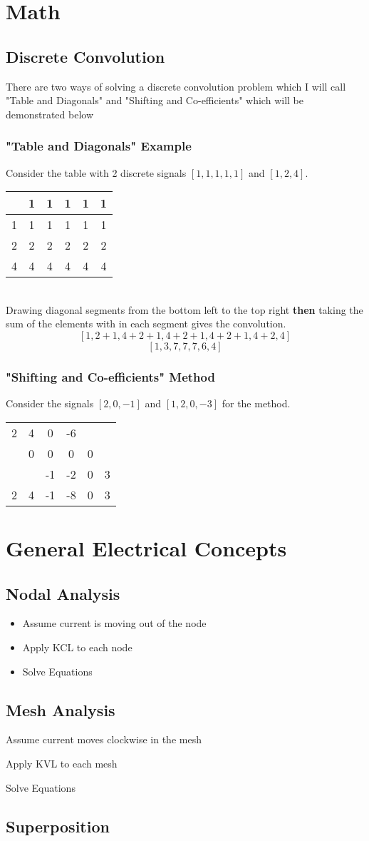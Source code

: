 \documentclass{article}
\begin{document}
\section*{Math}
\subsection*{Discrete Convolution}
There are two ways of solving a discrete convolution problem which I will call "Table and Diagonals" and "Shifting and Co-efficients" which will be demonstrated below
\subsubsection*{"Table and Diagonals" Example}
Consider the table with 2 discrete signals $ [1,1,1,1,1] $ and $ [1,2,4] $.\\
\begin{tabular}{c|ccccc}
	&1&1&1&1&1\\
	\hline
	1&1&1&1&1&1\\
	2&2&2&2&2&2\\
	4&4&4&4&4&4
\end{tabular}\\
Drawing diagonal segments from the bottom left to the top right \textbf{then} taking the sum of the elements with in each segment gives the convolution.
\[ [1, 2+1, 4+2+1, 4+2+1, 4+2+1, 4+2, 4] \]
\[ [1, 3, 7, 7, 7, 6, 4] \]
\subsubsection*{"Shifting and Co-efficients" Method}
Consider the signals $ [2,0,-1] $ and $ [1, 2, 0, -3] $ for the method.\\
\begin{tabular}{cccccc}
	2&4&0&-6&&\\
	&0&0&0&0&\\
	&&-1&-2&0&3\\
	\hline
	2&4&-1&-8&0&3
\end{tabular}
\section*{General Electrical Concepts}
\subsection*{Nodal Analysis}
\begin{itemize}
\item Assume current is moving out of the node
\item Apply KCL to each node
\item Solve Equations
\end{itemize}
\subsection*{Mesh Analysis}
\item Assume current moves clockwise in the mesh
\item Apply KVL to each mesh
\item Solve Equations
\subsection*{Superposition}
\end{document}
